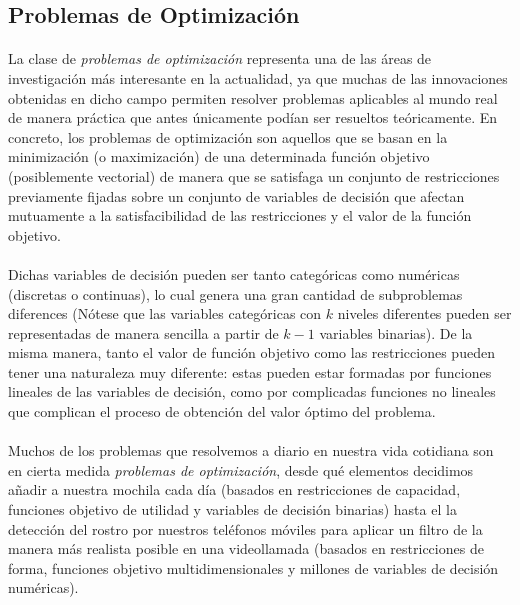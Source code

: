 \documentclass{subfiles}
\begin{document}
      \subsection{Problemas de Optimización}
      \label{sec:formulation_optimization_problems}

        \paragraph{}
        La clase de \emph{problemas de optimización} representa una de las áreas de investigación más interesante en la actualidad, ya que muchas de las innovaciones obtenidas en dicho campo permiten resolver problemas aplicables al mundo real de manera práctica que antes únicamente podían ser resueltos teóricamente. En concreto, los problemas de optimización son aquellos que se basan en la minimización (o maximización) de una determinada función objetivo (posiblemente vectorial) de manera que se satisfaga un conjunto de restricciones previamente fijadas sobre un conjunto de variables de decisión que afectan mutuamente a la satisfacibilidad de las restricciones y el valor de la función objetivo.

        \paragraph{}
        Dichas variables de decisión pueden ser tanto categóricas como numéricas (discretas o continuas), lo cual genera una gran cantidad de subproblemas diferences (Nótese que las variables categóricas con $k$ niveles diferentes pueden ser representadas de manera sencilla a partir de $k-1$ variables binarias). De la misma manera, tanto el valor de función objetivo como las restricciones pueden tener una naturaleza muy diferente: estas pueden estar formadas por funciones lineales de las variables de decisión, como por complicadas funciones no lineales que complican el proceso de obtención del valor óptimo del problema.

        \paragraph{}
        Muchos de los problemas que resolvemos a diario en nuestra vida cotidiana son en cierta medida \emph{problemas de optimización}, desde qué elementos decidimos añadir a nuestra mochila cada día (basados en restricciones de capacidad, funciones objetivo de utilidad y variables de decisión binarias) hasta el la detección del rostro por nuestros teléfonos móviles para aplicar un filtro de la manera más realista posible en una videollamada (basados en restricciones de forma, funciones objetivo multidimensionales y millones de variables de decisión numéricas).
\end{document}
